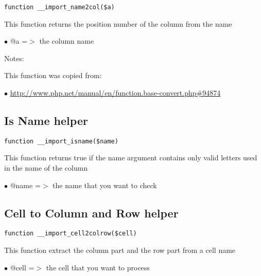 \documentclass[a4paper]{book}
\def\htmladdnormallink#1#2{\href{#2}{#1}}
\begin{document}
\begin{lstlisting}
function __import_name2col($a)
\end{lstlisting}

This function returns the position number of the column from the name

\begin{compactitem}
\item[\color{myblue}$\bullet$] @a =$>$ the column name
\end{compactitem}

Notes:

This function was copied from:

\begin{compactitem}
\item[\color{myblue}$\bullet$] \htmladdnormallink{http://www.php.net/manual/en/function.base-convert.php\#94874}{http://www.php.net/manual/en/function.base-convert.php\#94874}
\end{compactitem}

\hypertarget{toc179}{}
\subsection{Is Name helper}

\begin{lstlisting}
function __import_isname($name)
\end{lstlisting}

This function returns true if the name argument contains only valid letters
used in the name of the column

\begin{compactitem}
\item[\color{myblue}$\bullet$] @name =$>$ the name that you want to check
\end{compactitem}

\hypertarget{toc180}{}
\subsection{Cell to Column and Row helper}

\begin{lstlisting}
function __import_cell2colrow($cell)
\end{lstlisting}

This function extract the column part and the row part from a cell name

\begin{compactitem}
\item[\color{myblue}$\bullet$] @cell =$>$ the cell that you want to process
\end{compactitem}
\end{document}
